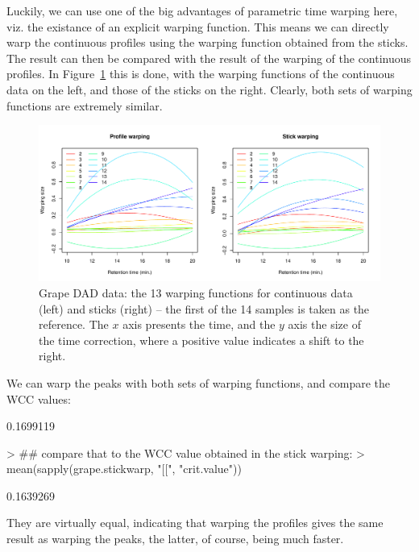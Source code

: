 \documentclass[a4paper,11pt]{article}
\begin{document}
Luckily, we can use one of the big advantages of parametric time
warping here, viz. the existance of an explicit warping function. This
means we can directly warp the continuous profiles using the warping
function obtained from the sticks. The result can then be compared
with the result of the warping of the continuous profiles. In
Figure~\ref{fig:warpComparison} this is done, with the warping
functions of the continuous data on the left, and those of the sticks
on the right. Clearly, both sets of warping functions are extremely similar.
\begin{figure}[bt]
  \centering
\includegraphics{stickPTW-011}
\caption{Grape DAD data: the 13 warping functions for continuous data
  (left) and sticks (right) -- the first of the 14 samples is taken as
  the reference. The $x$ axis presents the time, and the
  $y$ axis the size of the time correction, where a positive value
  indicates a shift to the right.}
\label{fig:warpComparison}
\end{figure}
We can warp the peaks with both sets of warping functions, and compare
the WCC values:
\begin{Schunk}
\begin{Soutput}
[1] 0.1699119
\end{Soutput}
\begin{Sinput}
> ## compare that to the WCC value obtained in the stick warping:
> mean(sapply(grape.stickwarp, "[[", "crit.value"))
\end{Sinput}
\begin{Soutput}
[1] 0.1639269
\end{Soutput}
\end{Schunk}
They are virtually equal, indicating that warping the profiles gives
the same result as warping the peaks, the latter, of course, being
much faster.
\end{document}
